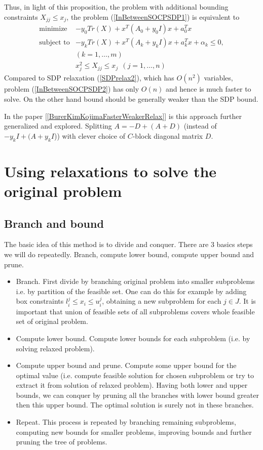 \documentclass[10pt,oneside]{book}
\theoremstyle{definition}
\begin{document}
Thus, in light of this proposition, the problem with additional bounding constraints $X_{jj}\leq x_j$, the problem (\ref{InBetweenSOCPSDP1}) is equivalent to 
\begin{equation}
\label{InBetweenSOCPSDP2}
\begin{array}{ll}
\mbox{minimize}& -y_0 Tr(X) +  x^T(A_0+y_0 I)x + a_0^Tx \\
\mbox{subject to}& -y_k Tr(X) +  x^T(A_k+y_kI)x + a_k^Tx + \alpha_k \leq 0, \\ &(k = 1,\dots ,m) \\
& x_j^2\leq X_{jj} \leq x_j \ \ (j = 1,\dots ,n)
\end{array} 
\end{equation}
Compared to SDP relaxation (\ref{SDPrelax2}), which has $O(n^2)$ variables, problem (\ref{InBetweenSOCPSDP2}) has only $O(n)$ and hence is much faster to solve. On the other hand bound should be generally weaker than the SDP bound.

In the paper [\ref{BurerKimKojimaFasterWeakerRelax}] is this approach further generalized and explored. Splitting $A= -D + (A+D)$ (instead of $-y_kI + (A +y_kI$)) with clever choice of $C$-block diagonal matrix $D$. 


\section{Using relaxations to solve the original problem }

\subsection{Branch and bound}

The basic idea of this method is to divide and conquer.
There are 3 basics steps we will do repeatedly. Branch, compute lower bound, compute upper bound and prune.
\begin{itemize}
\item Branch. First divide by branching original problem into smaller subproblems i.e. by partition of the feasible set. One can do this for example by adding box constraints $l^j_i\leq x_i \leq u^j_i$, obtaining a new subproblem for each $j\in J$.  It is important that union of feasible sets of all subproblems covers whole feasible set of original problem.
\item Compute lower bound. Compute lower bounds for each subproblem (i.e. by solving relaxed problem). 
\item Compute upper bound and prune. Compute some upper bound for the optimal value (i.e. compute feasible solution for chosen subproblem or try to extract it from solution of relaxed problem). Having both lower and upper bounds, we can conquer by pruning all the branches with lower bound greater then this upper bound. The optimal solution is surely not in these branches.
\item Repeat. This process is repeated by branching remaining subproblems, computing new bounds for smaller problems, improving bounds and further pruning the tree of problems.
\end{itemize}
\end{document}
